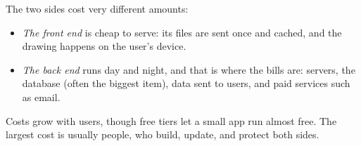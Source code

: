 \label{webapp-05:cost-what-it-costs-to-run}

The two sides cost very different amounts:

\begin{itemize}
\tightlist
\item
  \emph{The front end} is cheap to serve: its files are sent once and cached, and the drawing happens on the user's device.
\item
  \emph{The back end} runs day and night, and that is where the bills are: servers, the database (often the biggest item), data sent to users, and paid services such as email.
\end{itemize}

\noindent{}Costs grow with users, though free tiers let a small app run almost free. The largest cost is usually people, who build, update, and protect both sides.
